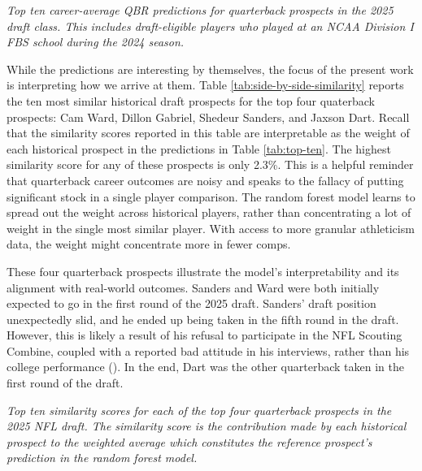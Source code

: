 \documentclass{article}
\begin{document}
\begin{table}[H]
  \centering
  
  \caption{\it Top ten career-average QBR predictions for quarterback prospects in the 2025 draft class. This includes draft-eligible players who played at an NCAA Division I FBS school during the 2024 season.}
  \label{tab:top-ten}
\end{table}

While the predictions are interesting by themselves, the focus of the present work is interpreting how we arrive at them. Table \ref{tab:side-by-side-similarity} reports the ten most similar historical draft prospects for the top four quaterback prospects: Cam Ward, Dillon Gabriel, Shedeur Sanders, and Jaxson Dart. Recall that the similarity scores reported in this table are interpretable as the weight of each historical prospect in the predictions in Table \ref{tab:top-ten}. The highest similarity score for any of these prospects is only 2.3\%. This is a helpful reminder that quarterback career outcomes are noisy and speaks to the fallacy of putting significant stock in a single player comparison. The random forest model learns to spread out the weight across historical players, rather than concentrating a lot of weight in the single most similar player. With access to more granular athleticism data, the weight might concentrate more in fewer comps.

These four quarterback prospects illustrate the model's interpretability and its alignment with real-world outcomes. Sanders and Ward were both initially expected to go in the first round of the 2025 draft. Sanders' draft position unexpectedly slid, and he ended up being taken in the fifth round in the draft. However, this is likely a result of his refusal to participate in the NFL Scouting Combine, coupled with a reported bad attitude in his interviews, rather than his college performance (\cite{mckenna_what_2025}). In the end, Dart was the other quarterback taken in the first round of the draft.

\begin{table}[H]
  \resizebox{\textwidth}{!}{
    
  }
  \caption{\it Top ten similarity scores for each of the top four quarterback prospects in the 2025 NFL draft. The similarity score is the contribution made by each historical prospect to the weighted average which constitutes the reference prospect's prediction in the random forest model.}
  \label{tab:side-by-side-similarity}
\end{table}
\end{document}

